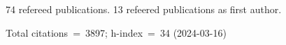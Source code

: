 74 refereed publications. 13 refeered publications as first author.

Total citations~=~3897; h-index~=~34 (2024-03-16)